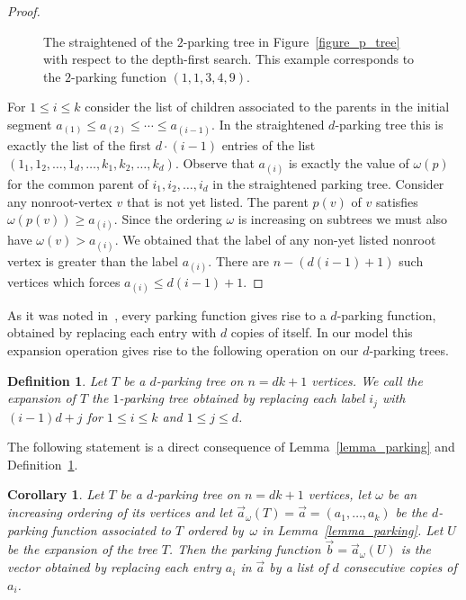 \documentclass[11pt]{amsart}
\newtheorem{definition}[theorem]{Definition}
\newtheorem{corollary}[theorem]{Corollary}
\numberwithin{equation}{section}
\begin{document}
\begin{proof}
\begin{figure}[ht]
\begin{center}
\end{center}
\caption{The straightened of the $2$-parking tree in Figure~\ref{figure_p_tree}
with respect to the depth-first search.
This example corresponds to the $2$-parking function $(1,1,3,4,9)$.}
\label{figure_p_tree_straightened}
\end{figure}
For $1 \leq i \leq k$ consider the list of children associated
to the parents in the initial segment $a_{(1)} \leq
a_{(2)} \leq \cdots \leq a_{(i-1)}$. In the straightened $d$-parking tree
this is exactly the list of the first $d\cdot(i-1)$ entries of the list $(1_{1},1_{2},\ldots, 1_{d}, \ldots, k_{1}, k_{2},\ldots,
k_{d})$. Observe that $a_{(i)}$ is exactly the value of
$\omega(p)$ for the common parent of $i_{1}, i_{2},\ldots,i_{d}$ in the
straightened parking tree.  Consider any nonroot-vertex $v$ that is not
yet listed. The parent $p(v)$ of $v$ satisfies $\omega(p(v))\geq
a_{(i)}$. Since the ordering $\omega$ is increasing on subtrees we must
also have $\omega(v)> a_{(i)}$. We obtained that the label of any
non-yet listed nonroot vertex is greater than the label $a_{(i)}$. There are
$n-(d(i-1)+1)$ such vertices which forces $a_{(i)} \leq d(i-1)+1$. 
\end{proof}  
As it was noted in~\cite[Section~1.6]{Irving_Rattan}, every parking
function gives rise to a $d$-parking function, obtained by replacing
each entry with $d$ copies of itself. In our model this expansion
operation gives rise to the following operation on our $d$-parking trees.
\begin{definition}
\label{definition_expansion}  
Let $T$ be a $d$-parking tree on $n=dk+1$ vertices. We call the {\em
  expansion of $T$} the $1$-parking tree obtained by replacing each
label $i_{j}$ with $(i-1)d+j$ for $1 \leq i \leq k$ and $1 \leq j \leq d$. 
\end{definition}  
The following statement is a direct consequence of
Lemma~\ref{lemma_parking} and Definition~\ref{definition_expansion}.
\begin{corollary}
Let $T$ be a $d$-parking tree on $n=dk+1$ vertices, let $\omega$ be
an increasing ordering of its vertices and let $\vec{a}_{\omega}(T)=\vec{a}=(a_{1},\ldots,a_{k})$ be
the $d$-parking function associated to $T$ ordered by~$\omega$ in Lemma~\ref{lemma_parking}.
Let $U$ be the expansion of the tree $T$.
Then the parking function $\vec{b}=\vec{a}_{\omega}(U)$
is the vector obtained  by replacing each entry $a_{i}$ in $\vec{a}$ by a
list of $d$ consecutive copies of $a_{i}$.
\end{corollary}  
\end{document}
